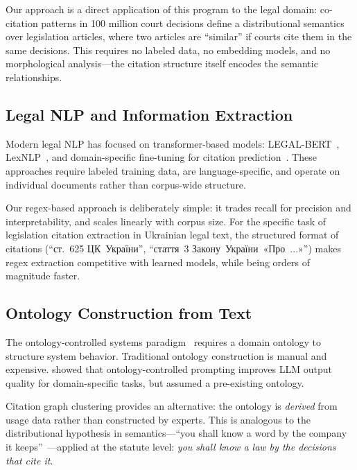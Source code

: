 \documentclass[11pt]{article}
\begin{document}
Our approach is a direct application of this program to the legal domain: co-citation patterns in 100 million court decisions define a distributional semantics over legislation articles, where two articles are ``similar'' if courts cite them in the same decisions.
This requires no labeled data, no embedding models, and no morphological analysis---the citation structure itself encodes the semantic relationships.

\subsection{Legal NLP and Information Extraction}

Modern legal NLP has focused on transformer-based models: LEGAL-BERT~\citep{chalkidis2020legal}, LexNLP~\citep{bommarito2018lexnlp}, and domain-specific fine-tuning for citation prediction~\citep{zhang2022citationprediction}.
These approaches require labeled training data, are language-specific, and operate on individual documents rather than corpus-wide structure.

Our regex-based approach is deliberately simple: it trades recall for precision and interpretability, and scales linearly with corpus size.
For the specific task of legislation citation extraction in Ukrainian legal text, the structured format of citations (``ст.~625 ЦК~України'', ``стаття~3 Закону~України~«Про~...»'') makes regex extraction competitive with learned models, while being orders of magnitude faster.

\subsection{Ontology Construction from Text}

The ontology-controlled systems paradigm~\citep{palagin2006architecture} requires a domain ontology to structure system behavior.
Traditional ontology construction is manual and expensive.
\citet{palagin2023ontochatgpt} showed that ontology-controlled prompting improves LLM output quality for domain-specific tasks, but assumed a pre-existing ontology.

Citation graph clustering provides an alternative: the ontology is \emph{derived} from usage data rather than constructed by experts.
This is analogous to the distributional hypothesis in semantics---``you shall know a word by the company it keeps''~\citep{palagin2020distributional}---applied at the statute level: \emph{you shall know a law by the decisions that cite it}.
\end{document}
